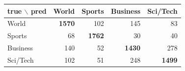 \begin{tabular}{@{}lrrrr@{}}
\toprule
true $\backslash$ pred & World & Sports & Business & Sci/Tech \\
\midrule
World & \textbf{1570} & 102 & 145 & 83 \\
Sports & 68 & \textbf{1762} & 30 & 40 \\
Business & 140 & 52 & \textbf{1430} & 278 \\
Sci/Tech & 102 & 51 & 248 & \textbf{1499} \\
\bottomrule
\end{tabular}